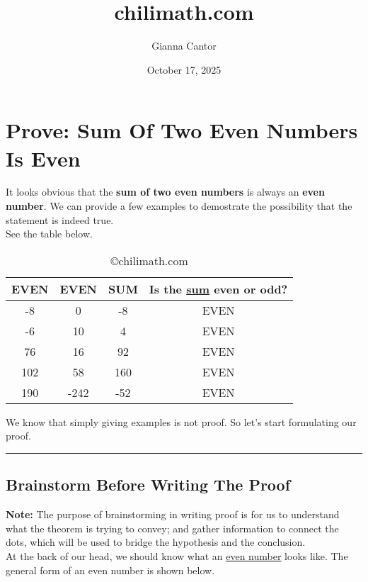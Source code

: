 \documentclass{article}
\title{chilimath.com}
\author{Gianna Cantor}
\date{October 17, 2025}
\begin{document}
\maketitle

\section{Prove: Sum Of Two Even Numbers Is Even}

It looks obvious that the \textbf{sum of two even numbers} is always an \textbf{even number}. We can provide a few examples to demostrate the possibility that the statement is indeed true. \\

See the table below. \\

\begin{table}[h!]
\begin{center}
\begin{tabular}{|c|c|c|c|}
    \hline
    EVEN & EVEN & SUM & Is the \underline{sum} even or odd? \\
    \hline
    -8 & 0 & -8 & EVEN \\
    -6 & 10 & 4 & EVEN \\
    76 & 16 & 92 & EVEN \\
    102 & 58 & 160 & EVEN \\
    190 & -242 & -52 & EVEN \\
    \hline
\end{tabular}
\caption{\copyright chilimath.com}
\end{center}
\label{tab:placeholder}
\end{table}

We know that simply giving examples is not proof. So let's start formulating our proof.

\vspace{1em} \hrule

\subsection{Brainstorm Before Writing The Proof}

\textbf{Note:} The purpose of brainstorming in writing proof is for us to understand what the theorem is trying to convey; and gather information to connect the dots, which will be used to bridge the hypothesis and the conclusion. \\

At the back of our head, we should know what an \underline{even number} looks like. The general form of an even number is shown below. \\
\end{document}
